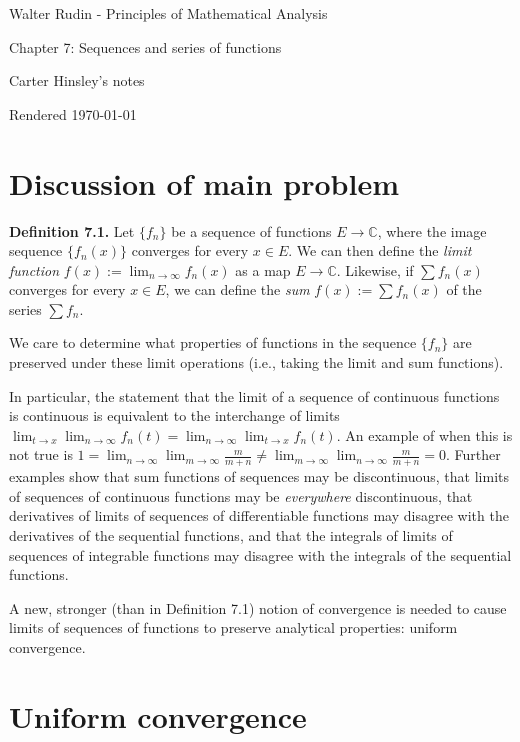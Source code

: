 \documentclass[a4paper]{article}
\newcommand{\C}{\mathbb{C}}
\begin{document}
\begin{center}
\LARGE{Walter Rudin - Principles of Mathematical Analysis}

\Large{Chapter 7: Sequences and series of functions}

\large{Carter Hinsley's notes}

Rendered \today
\end{center}

\section{Discussion of main problem}

\textbf{Definition 7.1.} Let $\{f_n\}$ be a sequence of functions $E \to \C$, where the image sequence $\{f_n(x)\}$ converges for every $x \in E$. We can then define the \emph{limit function} $\displaystyle f(x) := \lim_{n\to\infty} f_n(x)$ as a map $E \to \C$. Likewise, if $\sum f_n(x)$ converges for every $x \in E$, we can define the \emph{sum} $\displaystyle f(x) := \sum f_n(x)$ of the series $\sum f_n$.

We care to determine what properties of functions in the sequence $\{f_n\}$ are preserved under these limit operations (i.e., taking the limit and sum functions).

In particular, the statement that the limit of a sequence of continuous functions is continuous is equivalent to the interchange of limits $\displaystyle \lim_{t \to x} \lim_{n \to \infty} f_n(t) = \lim_{n \to \infty} \lim_{t \to x} f_n(t)$. An example of when this is not true is $\displaystyle 1 = \lim_{n \to \infty} \lim_{m \to \infty} \frac{m}{m + n} \neq \lim_{m \to \infty} \lim_{n \to \infty} \frac{m}{m + n} = 0$. Further examples show that sum functions of sequences may be discontinuous, that limits of sequences of continuous functions may be \emph{everywhere} discontinuous, that derivatives of limits of sequences of differentiable functions may disagree with the derivatives of the sequential functions, and that the integrals of limits of sequences of integrable functions may disagree with the integrals of the sequential functions.

A new, stronger (than in Definition 7.1) notion of convergence is needed to cause limits of sequences of functions to preserve analytical properties: uniform convergence.

\section{Uniform convergence}
\end{document}
